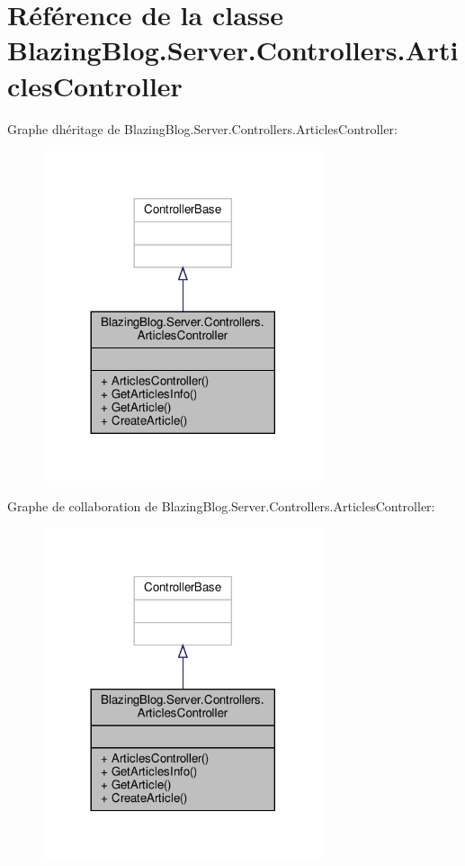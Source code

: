 \hypertarget{class_blazing_blog_1_1_server_1_1_controllers_1_1_articles_controller}{}\section{Référence de la classe Blazing\+Blog.\+Server.\+Controllers.\+Articles\+Controller}
\label{class_blazing_blog_1_1_server_1_1_controllers_1_1_articles_controller}


Graphe d\textquotesingle{}héritage de Blazing\+Blog.\+Server.\+Controllers.\+Articles\+Controller\+:
\nopagebreak
\begin{figure}[H]
\begin{center}
\leavevmode
\includegraphics[width=233pt]{class_blazing_blog_1_1_server_1_1_controllers_1_1_articles_controller__inherit__graph}
\end{center}
\end{figure}


Graphe de collaboration de Blazing\+Blog.\+Server.\+Controllers.\+Articles\+Controller\+:
\nopagebreak
\begin{figure}[H]
\begin{center}
\leavevmode
\includegraphics[width=233pt]{class_blazing_blog_1_1_server_1_1_controllers_1_1_articles_controller__coll__graph}
\end{center}
\end{figure}
